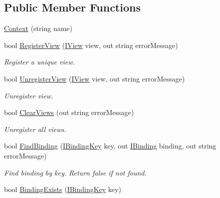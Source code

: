 \subsection*{Public Member Functions}
\begin{DoxyCompactItemize}
\item 
\mbox{\hyperlink{classcp_games_1_1core_1_1_rapid_m_v_c_1_1impl_1_1_context_a5f870e38ed7efdf3fe02ebe0f6052fa2}{Context}} (string name)
\item 
bool \mbox{\hyperlink{classcp_games_1_1core_1_1_rapid_m_v_c_1_1impl_1_1_context_aaca630e99979716757f6b028b8b4aa0c}{Register\+View}} (\mbox{\hyperlink{interfacecp_games_1_1core_1_1_rapid_m_v_c_1_1_i_view}{I\+View}} view, out string error\+Message)
\begin{DoxyCompactList}\small\item\em Register a unique view. \end{DoxyCompactList}\item 
bool \mbox{\hyperlink{classcp_games_1_1core_1_1_rapid_m_v_c_1_1impl_1_1_context_aa1b62f966c4cf9b70e12e4db3bd80903}{Unregister\+View}} (\mbox{\hyperlink{interfacecp_games_1_1core_1_1_rapid_m_v_c_1_1_i_view}{I\+View}} view, out string error\+Message)
\begin{DoxyCompactList}\small\item\em Unregister view. \end{DoxyCompactList}\item 
bool \mbox{\hyperlink{classcp_games_1_1core_1_1_rapid_m_v_c_1_1impl_1_1_context_aa35849819d74cafb71b0056f370872e2}{Clear\+Views}} (out string error\+Message)
\begin{DoxyCompactList}\small\item\em Unregister all views. \end{DoxyCompactList}\item 
bool \mbox{\hyperlink{classcp_games_1_1core_1_1_rapid_m_v_c_1_1impl_1_1_context_a22e05dce728f0684c16a3d4f3735b221}{Find\+Binding}} (\mbox{\hyperlink{interfacecp_games_1_1core_1_1_rapid_m_v_c_1_1_i_binding_key}{I\+Binding\+Key}} key, out \mbox{\hyperlink{interfacecp_games_1_1core_1_1_rapid_m_v_c_1_1_i_binding}{I\+Binding}} binding, out string error\+Message)
\begin{DoxyCompactList}\small\item\em Find binding by key. Return false if not found. \end{DoxyCompactList}\item 
bool \mbox{\hyperlink{classcp_games_1_1core_1_1_rapid_m_v_c_1_1impl_1_1_context_a57ed228fbab80263bf2197dd27eadbbd}{Binding\+Exists}} (\mbox{\hyperlink{interfacecp_games_1_1core_1_1_rapid_m_v_c_1_1_i_binding_key}{I\+Binding\+Key}} key)

\end{DoxyCompactItemize}
